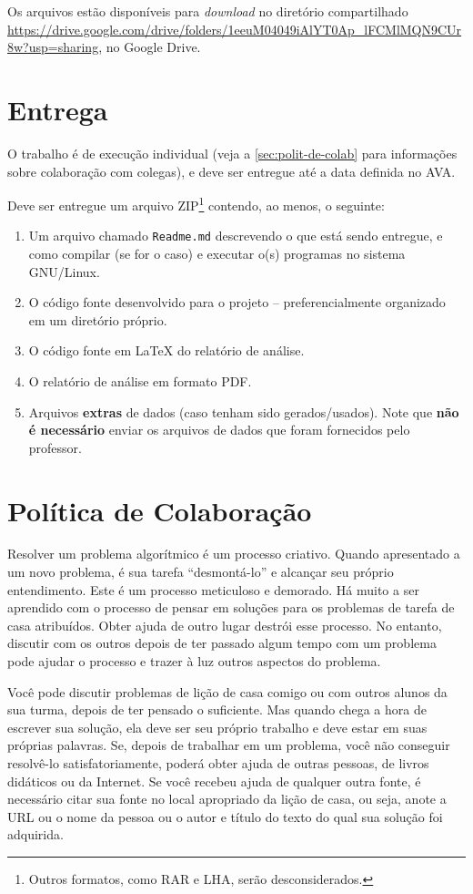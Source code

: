 \documentclass[a4paper,12pt]{scrartcl}
\begin{document}
Os arquivos estão disponíveis para \emph{download} no diretório compartilhado
\url{https://drive.google.com/drive/folders/1eeuM04049iAlYT0Ap_lFCMlMQN9CUr8w?usp=sharing},
no Google Drive.


\section{Entrega}

O trabalho é de execução individual (veja a \autoref{sec:polit-de-colab} para
informações sobre colaboração com colegas), e deve ser entregue até a data
definida no AVA.

Deve ser entregue um arquivo ZIP\footnote{Outros formatos, como RAR e LHA, serão
  desconsiderados.} contendo, ao menos, o seguinte:

\begin{enumerate}
\item Um arquivo chamado \texttt{Readme.md} descrevendo o que está sendo
  entregue, e como compilar (se for o caso) e executar o(s) programas no sistema
  GNU/Linux.
\item O código fonte desenvolvido para o projeto -- preferencialmente organizado
  em um diretório próprio.
\item O código fonte em \LaTeX{} do relatório de análise.
\item O relatório de análise em formato PDF.
\item Arquivos \textbf{extras} de dados (caso tenham sido gerados/usados). Note
  que \textbf{não é necessário} enviar os arquivos de dados que foram fornecidos
  pelo professor.
\end{enumerate}


\section{Política de Colaboração}
\label{sec:polit-de-colab}

Resolver um problema algorítmico é um processo criativo. Quando apresentado a um
novo problema, é sua tarefa ``desmontá-lo'' e alcançar seu próprio entendimento.
Este é um processo meticuloso e demorado. Há muito a ser aprendido com o
processo de pensar em soluções para os problemas de tarefa de casa atribuídos.
Obter ajuda de outro lugar destrói esse processo. No entanto, discutir com os
outros depois de ter passado algum tempo com um problema pode ajudar o processo
e trazer à luz outros aspectos do problema.

Você pode discutir problemas de lição de casa comigo ou com outros alunos da sua
turma, depois de ter pensado o suficiente. Mas quando chega a hora de escrever
sua solução, ela deve ser seu próprio trabalho e deve estar em suas próprias
palavras. Se, depois de trabalhar em um problema, você não conseguir resolvê-lo
satisfatoriamente, poderá obter ajuda de outras pessoas, de livros didáticos ou
da Internet. Se você recebeu ajuda de qualquer outra fonte, é necessário citar
sua fonte no local apropriado da lição de casa, ou seja, anote a URL ou o nome
da pessoa ou o autor e título do texto do qual sua solução foi adquirida.
\end{document}
